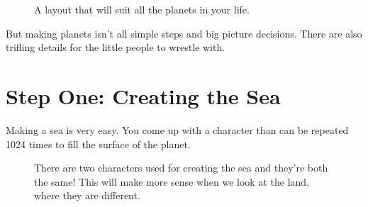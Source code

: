 \begin{figure}[H]
  {
      \begin{subfigure}{0.4\textwidth}
      \end{subfigure}
      \begin{subfigure}{0.4\textwidth}
      \end{subfigure}
      \begin{subfigure}{0.4\textwidth}
      \end{subfigure}
      \hspace{2.75cm}
      \begin{subfigure}{0.4\textwidth}
      \end{subfigure}
  }\caption[]{A layout that will suit all the planets in your life.}
\end{figure}

But making planets isn't all simple steps and big picture decisions. There are also
trifling details for the little people to wrestle with.

\section{Step One: Creating the Sea}

Making a sea is very easy. You come up with a character than can be repeated 1024 times to fill the
surface of the planet.

\begin{figure}[H]
{
  \setlength{\tabcolsep}{3.0pt}
  \setlength\cmidrulewidth{\heavyrulewidth} %
    \begin{adjustbox}{width=10cm,center}
  \begin{subfigure}{0.3\textwidth}
  
  \end{subfigure}
  \begin{subfigure}{0.3\textwidth}
  
  \end{subfigure}
  \end{adjustbox}
}\caption[]{There are two characters used for creating the sea and they're both the same! This will make more sense when
we look at the land, where they are different.}
\end{figure}


